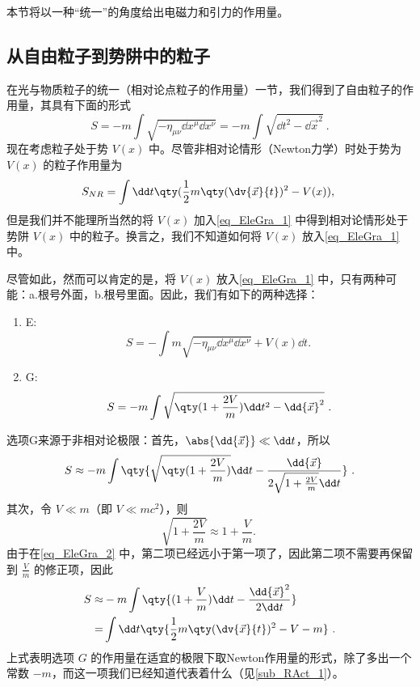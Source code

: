 
本节将以一种“统一”的角度给出电磁力和引力的作用量。
\subsection{从自由粒子到势阱中的粒子}
在光与物质粒子的统一（相对论点粒子的作用量）一节，我们得到了自由粒子的作用量，其具有下面的形式
\begin{equation}\label{eq_EleGra_1}
S=-m\int\sqrt{-\eta_{\mu\nu}\dd x^\mu\dd x^\nu}=-m\int\sqrt{\dd t^2-\dd{\vec x}^2}~.
\end{equation}
现在考虑粒子处于势 $V(x)$ 中。尽管非相对论情形（Newton力学）时处于势为 $V(x)$ 的粒子作用量为
\begin{equation}
S_{NR}=\int\dd t\qty(\frac{1}{2}m\qty(\dv{\vec x}{t})^2-V(x)),~
\end{equation}
但是我们并不能理所当然的将 $V(x)$ 加入\autoref{eq_EleGra_1} 中得到相对论情形处于势阱 $V(x)$ 中的粒子。换言之，我们不知道如何将 $V(x)$ 放入\autoref{eq_EleGra_1} 中。

尽管如此，然而可以肯定的是，将 $V(x)$ 放入\autoref{eq_EleGra_1} 中，只有两种可能：a.根号外面，b.根号里面。因此，我们有如下的两种选择：
\begin{enumerate}
\item E:
\begin{equation}
S=-\int{m\sqrt{-\eta_{\mu\nu}\dd x^\mu\dd x^\nu}+V(x)\dd t}.~
\end{equation}
\item G:
\begin{equation}\label{eq_EleGra_4}
S=-m\int\sqrt{\qty(1+\frac{2V}{m})\dd t^2-\dd{\vec x}^2}~.
\end{equation}
\end{enumerate}
选项G来源于非相对论极限：首先，$\abs{\dd{\vec x}}\ll \dd t$，所以
\begin{equation}\label{eq_EleGra_2}
S\approx-m\int \qty{\sqrt{\qty(1+\frac{2V}{m})}\dd t-\frac{\dd{\vec{x}}}{2\sqrt{1+\frac{2V}{m}}\dd t}}~.
\end{equation}
其次，令 $V\ll m$（即 $V\ll mc^2$），则
\begin{equation}
\sqrt{1+\frac{2V}{m}}\approx1+\frac{V}{m}.~
\end{equation}
由于在\autoref{eq_EleGra_2} 中，第二项已经远小于第一项了，因此第二项不需要再保留到 $\frac{V}{m}$ 的修正项，因此
\begin{equation}
\begin{aligned}
S\approx&-m\int \qty{(1+\frac{V}{m})\dd t-\frac{\dd{\vec x}^2}{2\dd t}}\\
=&\int \dd t\qty{\frac{1}{2}m\qty(\dv{\vec x}{t})^2-V-m}~.
\end{aligned}
\end{equation}
上式表明选项 $G$ 的作用量在适宜的极限下取Newton作用量的形式，除了多出一个常数 $-m$，而这一项我们已经知道代表着什么（见\autoref{sub_RAct_1}）。

